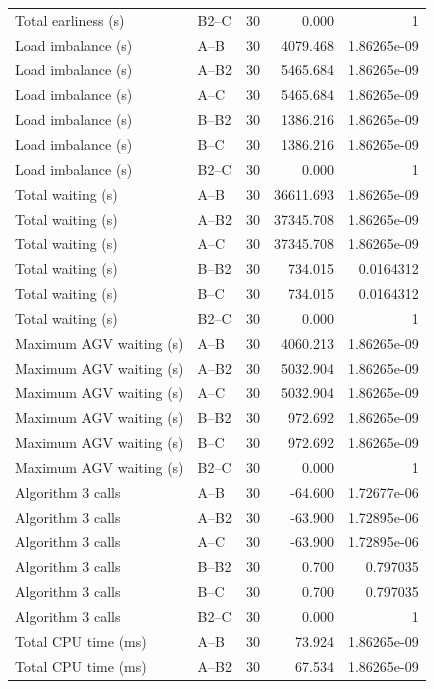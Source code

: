 \begin{table}[t]
\begin{tabular}{llrrr}
Total earliness (s) & B2--C & 30 & 0.000 & 1 \\
Load imbalance (s) & A--B & 30 & 4079.468 & 1.86265e-09 \\
Load imbalance (s) & A--B2 & 30 & 5465.684 & 1.86265e-09 \\
Load imbalance (s) & A--C & 30 & 5465.684 & 1.86265e-09 \\
Load imbalance (s) & B--B2 & 30 & 1386.216 & 1.86265e-09 \\
Load imbalance (s) & B--C & 30 & 1386.216 & 1.86265e-09 \\
Load imbalance (s) & B2--C & 30 & 0.000 & 1 \\
Total waiting (s) & A--B & 30 & 36611.693 & 1.86265e-09 \\
Total waiting (s) & A--B2 & 30 & 37345.708 & 1.86265e-09 \\
Total waiting (s) & A--C & 30 & 37345.708 & 1.86265e-09 \\
Total waiting (s) & B--B2 & 30 & 734.015 & 0.0164312 \\
Total waiting (s) & B--C & 30 & 734.015 & 0.0164312 \\
Total waiting (s) & B2--C & 30 & 0.000 & 1 \\
Maximum AGV waiting (s) & A--B & 30 & 4060.213 & 1.86265e-09 \\
Maximum AGV waiting (s) & A--B2 & 30 & 5032.904 & 1.86265e-09 \\
Maximum AGV waiting (s) & A--C & 30 & 5032.904 & 1.86265e-09 \\
Maximum AGV waiting (s) & B--B2 & 30 & 972.692 & 1.86265e-09 \\
Maximum AGV waiting (s) & B--C & 30 & 972.692 & 1.86265e-09 \\
Maximum AGV waiting (s) & B2--C & 30 & 0.000 & 1 \\
Algorithm 3 calls & A--B & 30 & -64.600 & 1.72677e-06 \\
Algorithm 3 calls & A--B2 & 30 & -63.900 & 1.72895e-06 \\
Algorithm 3 calls & A--C & 30 & -63.900 & 1.72895e-06 \\
Algorithm 3 calls & B--B2 & 30 & 0.700 & 0.797035 \\
Algorithm 3 calls & B--C & 30 & 0.700 & 0.797035 \\
Algorithm 3 calls & B2--C & 30 & 0.000 & 1 \\
Total CPU time (ms) & A--B & 30 & 73.924 & 1.86265e-09 \\
Total CPU time (ms) & A--B2 & 30 & 67.534 & 1.86265e-09 \\

\end{tabular}
\end{table}
